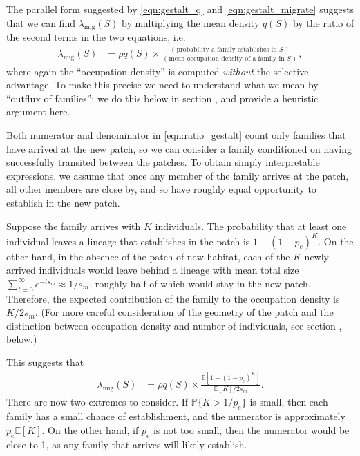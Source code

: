 \documentclass[10pt,letterpaper]{article}
\renewcommand{\P}{\mathbb{P}}
\newcommand{\E}{\mathbb{E}}
\newcommand{\migrate}{\lambda_\text{mig}}
\newcommand{\secref}[1]{{\emph{\nameref{#1}}}}
\begin{document}
The parallel form suggested by \eqref{eqn:gestalt_q} and \eqref{eqn:gestalt_migrate}
suggests that we can find $\migrate(S)$ by multiplying the mean density $q(S)$
by the ratio of the second terms in the two equations,
i.e.
\begin{align} \label{eqn:ratio_gestalt}
  \migrate(S) 
    &= \rho q(S) \times 
    \frac{
        \text{ ( probability a family establishes in $S$ ) }
    }{
        \text{ ( mean occupation density of a family in $S$ ) }
    } ,
\end{align}
where again the ``occupation density'' is computed \emph{without} the selective advantage.
To make this precise we need to understand what we mean by ``outflux of families'';
we do this below in section \secref{ss:hitting_occupation},
and provide a heuristic argument here.

Both numerator and denominator in \eqref{eqn:ratio_gestalt} 
count only families that have arrived at the new patch,
so we can consider a family conditioned on having successfully transited between the patches.
To obtain simply interpretable expressions,
we assume that once any member of the family arrives at the patch,
all other members are close by, and so have roughly equal opportunity
to establish in the new patch.

Suppose the family arrives with $K$ individuals.
The probability that at least one individual leaves a lineage that establishes in the patch
is $1-(1-p_e)^K$.
On the other hand, in the absence of the patch of new habitat,
each of the $K$ newly arrived individuals would leave behind a lineage with 
mean total size $\sum_{t=0}^\infty e^{-t s_m} \approx 1/s_m$,
roughly half of which would stay in the new patch.
Therefore, the expected contribution of the family to the occupation density is $K/2s_m$.
(For more careful consideration of the geometry of the patch
and the distinction between occupation density and number of individuals,
see section \secref{ss:hitting_occupation}, below.)

This suggests that 
\begin{align} \label{eqn:ratio_K}
  \migrate(S) 
    &= \rho q(S) \times 
    \frac{
        \E[1-(1-p_e)^K]
    }{
        \E[K]/2s_m
    } .
\end{align}
There are now two extremes to consider.
If $\P\{K>1/p_e\}$ is small, then each family has a small chance of establishment,
and the numerator is approximately $p_e \E[K]$.
On the other hand, if $p_e$ is not too small,
then the numerator would be close to 1, as any family that arrives will likely establish.
\end{document}
